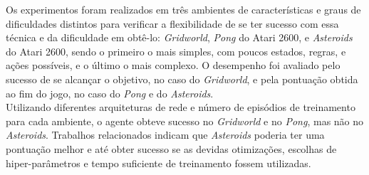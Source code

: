 Os experimentos foram realizados em três ambientes de características e graus de dificuldades distintos para verificar a flexibilidade de se ter sucesso com essa técnica e da dificuldade em obtê-lo: \textit{Gridworld}, \textit{Pong} do Atari 2600, e \textit{Asteroids} do Atari 2600, sendo o primeiro o mais simples, com poucos estados, regras, e ações possíveis, e o último o mais complexo.
O desempenho foi avaliado pelo sucesso de se alcançar o objetivo, no caso do \textit{Gridworld}, e pela pontuação obtida ao fim do jogo, no caso do \textit{Pong} e do \textit{Asteroids}.
\\

Utilizando diferentes arquiteturas de rede e número de episódios de treinamento para cada ambiente, o agente obteve sucesso no \textit{Gridworld} e no \textit{Pong}, mas não no \textit{Asteroids}.
Trabalhos relacionados indicam que \textit{Asteroids} poderia ter uma pontuação melhor e até obter sucesso se as devidas otimizações, escolhas de hiper-parâmetros e tempo suficiente de treinamento fossem utilizadas.
\\




